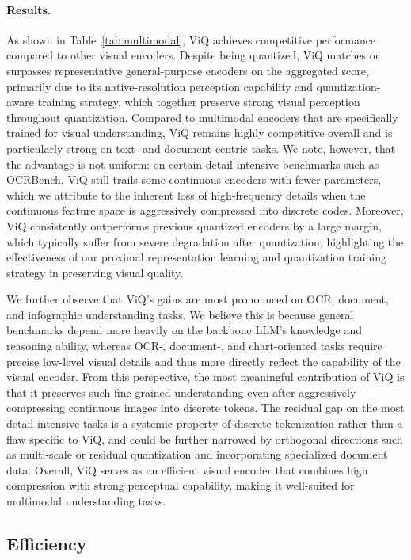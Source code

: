 \documentclass{llmxive}
\begin{document}
\paragraph{Results.} As shown in Table~\ref{tab:multimodal}, ViQ achieves competitive performance compared to other visual encoders. Despite being quantized, ViQ matches or surpasses representative general-purpose encoders on the aggregated score, primarily due to its native-resolution perception capability and quantization-aware training strategy, which together preserve strong visual perception throughout quantization. Compared to multimodal encoders that are specifically trained for visual understanding, ViQ remains highly competitive overall and is particularly strong on text- and document-centric tasks. We note, however, that the advantage is not uniform: on certain detail-intensive benchmarks such as OCRBench, ViQ still trails some continuous encoders with fewer parameters, which we attribute to the inherent loss of high-frequency details when the continuous feature space is aggressively compressed into discrete codes. Moreover, ViQ consistently outperforms previous quantized encoders by a large margin, which typically suffer from severe degradation after quantization, highlighting the effectiveness of our proximal representation learning and quantization training strategy in preserving visual quality.

We further observe that ViQ's gains are most pronounced on OCR, document, and infographic understanding tasks. We believe this is because general benchmarks depend more heavily on the backbone LLM's knowledge and reasoning ability, whereas OCR-, document-, and chart-oriented tasks require precise low-level visual details and thus more directly reflect the capability of the visual encoder. From this perspective, the most meaningful contribution of ViQ is that it preserves such fine-grained understanding even after aggressively compressing continuous images into discrete tokens. The residual gap on the most detail-intensive tasks is a systemic property of discrete tokenization rather than a flaw specific to ViQ, and could be further narrowed by orthogonal directions such as multi-scale or residual quantization and incorporating specialized document data. Overall, ViQ serves as an efficient visual encoder that combines high compression with strong perceptual capability, making it well-suited for multimodal understanding tasks.

\subsection{Efficiency}
\end{document}
